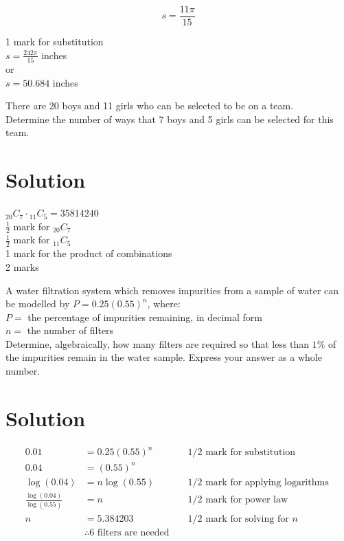 \documentclass[10pt]{article}
\begin{document}
\begin{equation*}
s=\frac{11 \pi}{15} \tag{22}
\end{equation*}


1 mark for substitution\\
$s=\frac{242 \pi}{15}$ inches\\
or\\
$s=50.684$ inches

There are 20 boys and 11 girls who can be selected to be on a team.\\
Determine the number of ways that 7 boys and 5 girls can be selected for this team.

\section*{Solution}
${ }_{20} C_{7} \cdot{ }_{11} C_{5}=35814240$\\
$\frac{1}{2}$ mark for ${ }_{20} C_{7}$\\
$\frac{1}{2}$ mark for ${ }_{11} C_{5}$\\
1 mark for the product of combinations\\
2 marks

A water filtration system which removes impurities from a sample of water can be modelled by $P=0.25(0.55)^{n}$, where:\\
$P=$ the percentage of impurities remaining, in decimal form\\
$n=$ the number of filters\\
Determine, algebraically, how many filters are required so that less than $1 \%$ of the impurities remain in the water sample. Express your answer as a whole number.

\section*{Solution}
$$
\begin{array}{rlrl}
0.01 & =0.25(0.55)^{n} & & 1 / 2 \text { mark for substitution } \\
0.04 & =(0.55)^{n} & & \\
\log (0.04) & =n \log (0.55) & & 1 / 2 \text { mark for applying logarithms } \\
\frac{\log (0.04)}{\log (0.55)} & =n & & 1 / 2 \text { mark for power law } \\
n & =5.384203 & & 1 / 2 \text { mark for solving for } n \\
& \therefore 6 \text { filters are needed } &
\end{array}
$$
\end{document}
